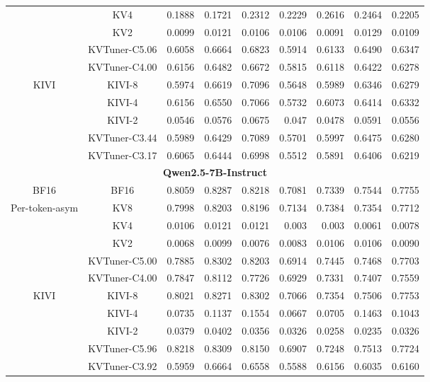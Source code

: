 \begin{table}
{\begin{tabular}{ c c | r r r | r r r | r  }
    & KV4 & 0.1888 & 0.1721 & 0.2312 & 0.2229 & 0.2616 & 0.2464 & 0.2205 \\
    & KV2 & 0.0099 & 0.0121 & 0.0106 & 0.0106 & 0.0091 & 0.0129 & 0.0109 \\ \cline{2-9}
    & KVTuner-C5.06 & 0.6058 & 0.6664 & 0.6823 & 0.5914 & 0.6133 & 0.6490 & 0.6347 \\
    & KVTuner-C4.00 & 0.6156 & 0.6482 & 0.6672 & 0.5815 & 0.6118 & 0.6422 & 0.6278 \\\hline
\multirow{5}{*}{KIVI}
    & KIVI-8 & 0.5974 & 0.6619 & 0.7096 & 0.5648 & 0.5989 & 0.6346 & 0.6279 \\
    & KIVI-4 & 0.6156 & 0.6550 & 0.7066 & 0.5732 & 0.6073 & 0.6414 & 0.6332 \\
    & KIVI-2 & 0.0546 & 0.0576 & 0.0675 & 0.047 & 0.0478 & 0.0591 & 0.0556 \\ \cline{2-9}
    & KVTuner-C3.44 & 0.5989 & 0.6429 & 0.7089 & 0.5701 & 0.5997 & 0.6475 & 0.6280 \\
    & KVTuner-C3.17 & 0.6065 & 0.6444 & 0.6998 & 0.5512 & 0.5891 & 0.6406 & 0.6219 \\ \hline
\multicolumn{9}{c}{\textbf{Qwen2.5-7B-Instruct}} \\ \hline
\multirow{1}{*}{BF16}
    & BF16 & 0.8059 & 0.8287 & 0.8218 & 0.7081 & 0.7339 & 0.7544 & 0.7755 \\ \hline
\multirow{5}{*}{Per-token-asym}
    & KV8 & 0.7998 & 0.8203 & 0.8196 & 0.7134 & 0.7384 & 0.7354 & 0.7712 \\
    & KV4 & 0.0106 & 0.0121 & 0.0121 & 0.003 & 0.003 & 0.0061 & 0.0078 \\
    & KV2 & 0.0068 & 0.0099 & 0.0076 & 0.0083 & 0.0106 & 0.0106 & 0.0090 \\ \cline{2-9}
    & KVTuner-C5.00 & 0.7885 & 0.8302 & 0.8203 & 0.6914 & 0.7445 & 0.7468 & 0.7703 \\
    & KVTuner-C4.00 & 0.7847 & 0.8112 & 0.7726 & 0.6929 & 0.7331 & 0.7407 & 0.7559 \\\hline
\multirow{5}{*}{KIVI}
    & KIVI-8 & 0.8021 & 0.8271 & 0.8302 & 0.7066 & 0.7354 & 0.7506 & 0.7753 \\
    & KIVI-4 & 0.0735 & 0.1137 & 0.1554 & 0.0667 & 0.0705 & 0.1463 & 0.1043 \\
    & KIVI-2 & 0.0379 & 0.0402 & 0.0356 & 0.0326 & 0.0258 & 0.0235 & 0.0326 \\ \cline{2-9}
    & KVTuner-C5.96 & 0.8218 & 0.8309 & 0.8150 & 0.6907 & 0.7248 & 0.7513 & 0.7724 \\
    & KVTuner-C3.92 & 0.5959 & 0.6664 & 0.6558 & 0.5588 & 0.6156 & 0.6035 & 0.6160 \\ \bottomrule

\end{tabular}}
\end{table}
